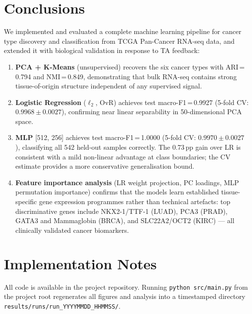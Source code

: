 \documentclass[11pt,letterpaper]{article}
\begin{document}
\section{Conclusions}
\label{sec:conclusions}

We implemented and evaluated a complete machine learning pipeline for cancer
type discovery and classification from TCGA Pan-Cancer RNA-seq data, and
extended it with biological validation in response to TA feedback:

\begin{enumerate}[leftmargin=2em,itemsep=2pt]
  \item \textbf{PCA + K-Means} (unsupervised) recovers the six cancer types
        with ARI\,=\,0.794 and NMI\,=\,0.849, demonstrating that bulk RNA-seq
        contains strong tissue-of-origin structure independent of any
        supervised signal.
  \item \textbf{Logistic Regression} ($\ell_2$, OvR) achieves test
        macro-F1\,=\,0.9927 (5-fold CV: $0.9968 \pm 0.0027$), confirming near
        linear separability in 50-dimensional PCA space.
  \item \textbf{MLP} [512, 256] achieves test macro-F1\,=\,1.0000 (5-fold CV:
        $0.9970 \pm 0.0027$), classifying all 542 held-out samples correctly.
        The 0.73\,pp gain over LR is consistent with a mild non-linear advantage
        at class boundaries; the CV estimate provides a more conservative
        generalisation bound.
  \item \textbf{Feature importance analysis} (LR weight projection, PC
        loadings, MLP permutation importance) confirms that the models learn
        established tissue-specific gene expression programmes rather than
        technical artefacts: top discriminative genes include NKX2-1/TTF-1
        (LUAD), PCA3 (PRAD), GATA3 and Mammaglobin (BRCA), and SLC22A2/OCT2
        (KIRC) --- all clinically validated cancer biomarkers.
\end{enumerate}

\section*{Implementation Notes}

All code is available in the project repository.  Running
\texttt{python src/main.py} from the project root regenerates all figures and
analysis into a timestamped directory \texttt{results/runs/run\_YYYYMMDD\_HHMMSS/}.
\end{document}
